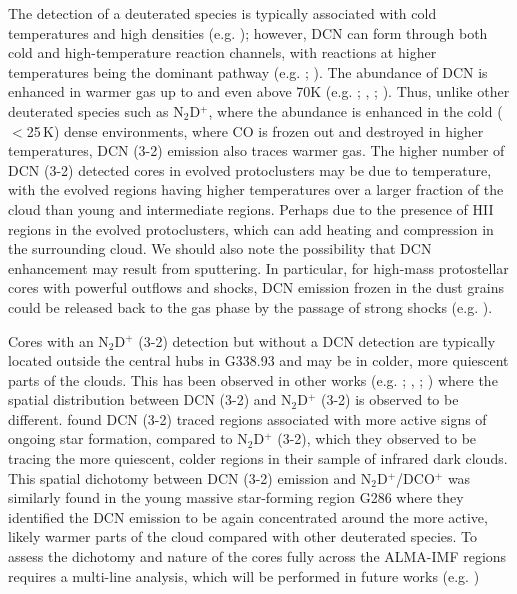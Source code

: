\documentclass[longauth]{aa} %
\begin{document}
The detection of a deuterated species is typically associated with cold temperatures and high densities (e.g. \citealt{RobertsandMillar2000}); however, DCN can form through both cold and high-temperature reaction channels, with reactions at higher temperatures being the dominant pathway (e.g. \citealt{Turner2001}; \citealt{Roueff2013}). The abundance of DCN is enhanced in warmer gas up to and even above 70K (e.g. \citealt{Millar1989}; \citealt{Turner2001}, \citealt{Roueff2007}; \citealt{Roueff2013}). Thus, unlike other deuterated species such as N$_2$D$^+$, where the abundance is enhanced in the cold ($<$25\,K) dense environments, where CO is frozen out and destroyed in higher temperatures, DCN (3-2) emission also traces warmer gas. The higher number of DCN (3-2) detected cores in evolved protoclusters may be due to temperature, with the evolved regions having higher temperatures over a larger fraction of the cloud than young and intermediate regions. Perhaps due to the presence of HII regions in the evolved protoclusters, which can add heating and compression in the surrounding cloud. We should also note the possibility that DCN enhancement may result from sputtering. In particular, for high-mass protostellar cores with powerful outflows and shocks, DCN emission frozen in the dust grains could be released back to the gas phase by the passage of strong shocks (e.g. \citealt{Busquet2017}). 

Cores with an N$_2$D$^+$ (3-2) detection but without a DCN detection are typically located outside the central hubs in G338.93 and may be in colder, more quiescent parts of the clouds. This has been observed in other works (e.g. \citealt{Tatematsu2020}; \citealt{Cheng2020}, \citealt{Li2022}; \citealt{Sakai2022}) where the spatial distribution between DCN (3-2) and N$_2$D$^+$ (3-2) is observed to be different. \citealt{Sakai2022} found DCN (3-2) traced regions associated with more active signs of ongoing star formation, compared to N$_2$D$^+$ (3-2), which they observed to be tracing the more quiescent, colder regions in their sample of infrared dark clouds. This spatial dichotomy between DCN (3-2) emission and N$_2$D$^+$/DCO$^+$ was similarly found in the young massive star-forming region G286 \citep{Cheng2020} where they identified the DCN emission to be again concentrated around the more active, likely warmer parts of the cloud compared with other deuterated species. To assess the dichotomy and nature of the cores fully across the ALMA-IMF regions requires a multi-line analysis, which will be performed in future works (e.g. \citealt{Cunningham23})
\end{document}
